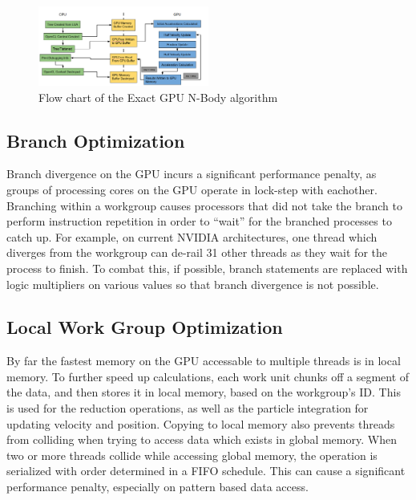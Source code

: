 \documentclass[fleqn,10pt]{SelfArx} %
\begin{document}
\begin{figure}[h]
    \centering
    \includegraphics[width=0.5\textwidth]{GPUExact.png}
    \caption{Flow chart of the Exact GPU N-Body algorithm}
\end{figure}



\subsection{Branch Optimization}
Branch divergence on the GPU incurs a significant performance penalty, as groups of processing cores on the GPU operate in lock-step with eachother. Branching within a workgroup causes processors that did not take the branch to perform instruction repetition in order to “wait” for the branched processes to catch up. For example, on current NVIDIA architectures, one thread which diverges from the workgroup can de-rail 31 other threads as they wait for the process to finish. To combat this, if possible, branch statements are replaced with logic multipliers on various values so that branch divergence is not possible.

\subsection{Local Work Group Optimization}
By far the fastest memory on the GPU accessable to multiple threads is in local memory. To further speed up calculations, each work unit chunks off a segment of the data, and then stores it in local memory, based on the workgroup’s ID. This is used for the reduction operations, as well as the particle integration for updating velocity and position. Copying to local memory also prevents threads from colliding when trying to access data which exists in global memory. When two or more threads collide while accessing global memory, the operation is serialized with order determined in a FIFO schedule. This can cause a significant performance penalty, especially on pattern based data access.



\end{document}
